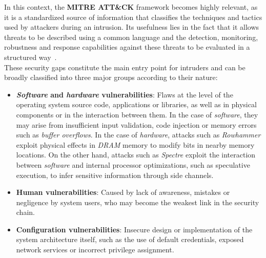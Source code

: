In this context, the \textbf{MITRE ATT\&CK} framework becomes highly relevant, as it is a standardized source of information that classifies the techniques and tactics used by attackers during an intrusion.
Its usefulness lies in the fact that it allows threats to be described using a common language and the detection, monitoring, robustness and response capabilities against these threats to be evaluated in a structured way~\cite{mitre_attack}.\\

These security gaps constitute the main entry point for intruders and can be broadly classified into three major groups according to their nature:
\begin{itemize}
    \item \textbf{\textit{Software} and \textit{hardware} vulnerabilities}: Flaws at the level of the operating system source code, applications or libraries, as well as in physical components or in the interaction between them.
    In the case of \textit{software}, they may arise from insufficient input validation, code injection or memory errors such as \textit{buffer overflows}.
    In the case of \textit{hardware}, attacks such as \textit{Rowhammer} exploit physical effects in \textit{DRAM} memory to modify bits in nearby memory locations.
    On the other hand, attacks such as \textit{Spectre} exploit the interaction between \textit{software} and internal processor optimizations, such as speculative execution, to infer sensitive information through side channels.
    \item \textbf{Human vulnerabilities}: Caused by lack of awareness, mistakes or negligence by system users, who may become the weakest link in the security chain.
    \item \textbf{Configuration vulnerabilities}: Insecure design or implementation of the system architecture itself, such as the use of default credentials, exposed network services or incorrect privilege assignment.
\end{itemize}

\

